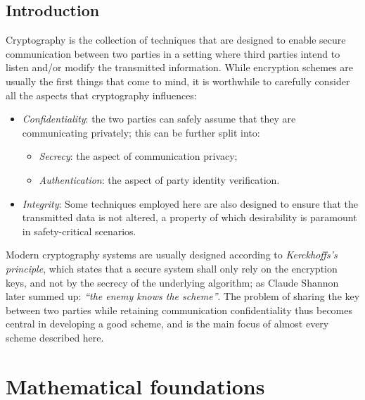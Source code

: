 \documentclass[10pt, a4paper]{report}
\theoremstyle{definition}
\theoremstyle{remark}
\begin{document}
    \tableofcontents

    \chapter{Introduction}

    Cryptography is the collection of techniques that are designed to enable secure communication between two parties in a setting where third parties intend to listen and/or modify the transmitted information. While encryption schemes are usually the first things that come to mind, it is worthwhile to carefully consider all the aspects that cryptography influences:

    \begin{itemize}
        \item \emph{Confidentiality}: the two parties can safely assume that they are communicating privately; this can be further split into:
              \begin{itemize}
                  \item \emph{Secrecy}: the aspect of communication privacy;
                  \item \emph{Authentication}: the aspect of party identity verification.
              \end{itemize}

        \item \emph{Integrity}: Some techniques employed here are also designed to ensure that the transmitted data is not  altered, a property of which desirability is paramount in safety-critical scenarios.
    \end{itemize}

    Modern cryptography systems are usually designed according to \emph{Kerckhoffs's principle}, which states that a secure system  shall only rely on the encryption keys, and not by the secrecy of the underlying algorithm; as Claude Shannon later summed up: \emph{``the enemy knows the scheme''}. The problem of sharing the key between two parties while retaining communication   confidentiality thus becomes central in developing a good scheme, and is the main focus of almost every scheme described here.

    \part{Mathematical foundations}

    
    
    
    
    
\end{document}
